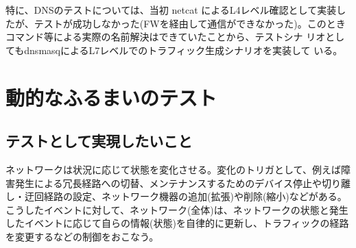 特に、DNSのテストについては、当初 netcat によるL4レベル確認として実装し
たが、テストが成功しなかった(FWを経由して通信ができなかった)。このとき
コマンド等による実際の名前解決はできていたことから、テストシナ
リオとしてもdnsmasqによるL7レベルでのトラフィック生成シナリオを実装して
いる。

 \section{動的なふるまいのテスト}

  \subsection{テストとして実現したいこと}
  \label{sec:dynamic-test-target}
ネットワークは状況に応じて状態を変化させる。変化のトリガとして、例えば障
害発生による冗長経路への切替、メンテナンスするためのデバイス停止や切り離
し・迂回経路の設定、ネットワーク機器の追加(拡張)や削除(縮小)などがある。
こうしたイベントに対して、ネットワーク(全体)は、ネットワークの状態と発生
したイベントに応じて自らの情報(状態)を自律的に更新し、トラフィックの経路
を変更するなどの制御をおこなう。


